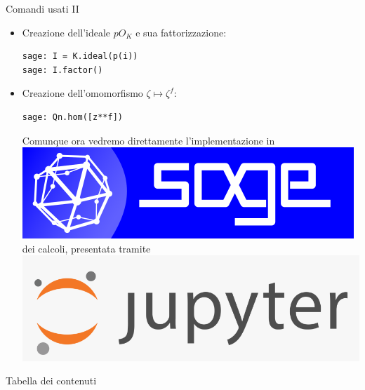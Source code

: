 \documentclass{beamer}
\theoremstyle{plain}
\theoremstyle{remark}
\theoremstyle{definition}
\newcommand{\sage}{\href{https://www.sagemath.org}{\includegraphics[height=\fontcharht\font`\B]{../images/sage.png} }}
\newcommand{\jupyter}{\href{https://www.sagemath.org}{\includegraphics[height=\fontcharht\font`\B]{../images/jupyter.png} }}
\begin{document}
\begin{frame}[fragile]{Comandi usati II}

\begin{itemize}
\item Creazione dell'ideale $ pO_K $ e sua fattorizzazione:
\begin{lstlisting}
sage: I = K.ideal(p(i))
sage: I.factor()
\end{lstlisting}

\item Creazione dell'omomorfismo $ \zeta \mapsto \zeta^f $:
\begin{lstlisting}
sage: Qn.hom([z**f])
\end{lstlisting}

\pause 
Comunque ora vedremo direttamente l'implementazione in \sage dei calcoli, presentata tramite \jupyter


\end{itemize}	
\end{frame}

	\begin{frame}[allowframebreaks]{Tabella dei contenuti}
		\tableofcontents
	\end{frame}
	
	

	
	
	
	
	
\end{document}
